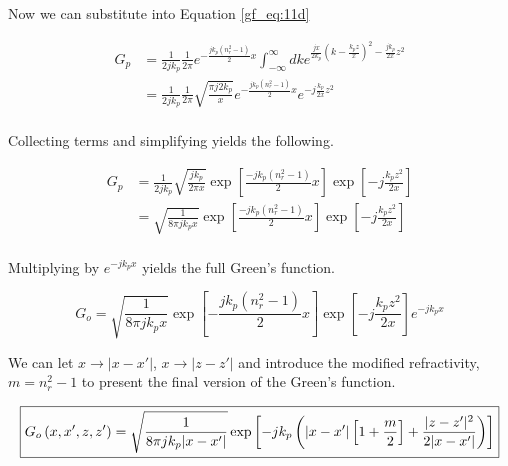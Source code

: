 \noindent Now we can substitute into Equation \ref{gf_eq:11d}

\begin{equation}
\begin{aligned}
G_p &= \frac{1}{2jk_p}\frac{1}{2\pi}e^{-\frac{jk_p(n_r^2-1)}{2}x}\int_{-\infty}^{\infty}dk e^{\frac{jx}{2k_p}\left(k  -\frac{k_pz}{x}\right)^2- \frac{jk_p}{2x}z^2 } \\
&= \frac{1}{2jk_p}\frac{1}{2\pi} \sqrt{\frac{\pi j2k_p}{x}}e^{-\frac{jk_p(n_r^2-1)}{2}x}e^{-j\frac{k_p}{2x}z^2 } \\
\end{aligned}
\label{gf_eq:11f}
\end{equation}
 \renewcommand{\baselinestretch}{2} \small\normalsize
 
\noindent Collecting terms and simplifying yields the following.

 \begin{equation}
\begin{aligned}
G_p &= \frac{1}{2jk_p}\sqrt{\frac{jk_p}{2\pi x}}\exp\left[\frac{-jk_p(n_r^2-1)}{2}x\right]\exp\left[-j\frac{k_pz^2}{2x} \right]\\
&= \sqrt{\frac{1}{8\pi j k_px}}\exp\left[\frac{-jk_p(n_r^2-1)}{2}x\right]\exp\left[-j\frac{k_pz^2}{2x} \right]\\
\end{aligned}
\label{gf_eq:11ffa}
\end{equation}
 \renewcommand{\baselinestretch}{2} \small\normalsize
 
\noindent Multiplying by $e^{-jk_px}$ yields the full Green's function.

\begin{equation}
G_o= \sqrt{\frac{1}{8\pi jk_px}}\exp\left[-\frac{jk_p(n_r^2-1)}{2}x\right]\exp\left[-j\frac{k_pz^2}{2x} \right]e^{-jk_px}
\label{gf_eq:11fa}
\end{equation}
  \renewcommand{\baselinestretch}{2} \small\normalsize
  
We can let $x\rightarrow |x-x'|$, $x\rightarrow |z-z'|$ and introduce the modified refractivity, $m = n_r^2-1$ to present the final version of the Green's function.

\begin{equation}
\boxed{G_o\left(x,x',z,z' \right)= \sqrt{\frac{1}{8\pi jk_p|x-x'|}}\exp\left[-jk_p\left(|x-x'|\left[1+\frac{m}{2}\right] + \frac{|z-z'|^2}{2|x-x'|}\right)\right]}\\
\label{gf_eq:11fb}
\end{equation}
 \renewcommand{\baselinestretch}{2} \small\normalsize
 
